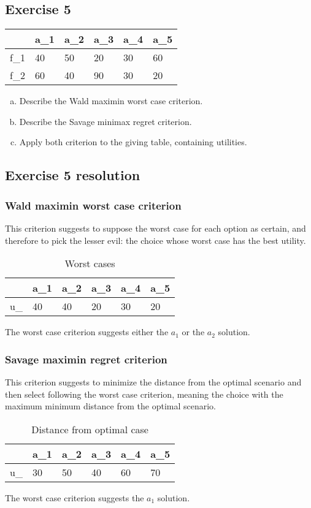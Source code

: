 \documentclass[\main/main.tex]{subfiles}
\begin{document}
\subsection{Exercise 5}

\begin{table}
  \begin{tabular}{L|LLLLL}
        & a_1 & a_2 & a_3 & a_4 & a_5 \\
    \hline
    f_1 & 40  & 50  & 20  & 30  & 60  \\
    f_2 & 60  & 40  & 90  & 30  & 20
  \end{tabular}
\end{table}

\begin{enumerate}[a)]
  \item Describe the Wald maximin worst case criterion.
  \item Describe the Savage minimax regret criterion.
  \item Apply both criterion to the giving table, containing utilities.
\end{enumerate}

\subsection{Exercise 5 resolution}
\subsubsection*{Wald maximin worst case criterion}
This criterion suggests to suppose the worst case for each option as certain, and therefore to pick the lesser evil: the choice whose worst case has the best utility.

\begin{table}
  \begin{tabular}{L|LLLLL}
                    & a_1 & a_2 & a_3 & a_4 & a_5 \\
    \hline
    u_{} & 40  & 40  & 20  & 30  & 20  \\
  \end{tabular}
  \caption{Worst cases}
\end{table}

The worst case criterion suggests either the $a_1$ or the $a_2$ solution.

\subsubsection*{Savage maximin regret criterion}
This criterion suggests to minimize the distance from the optimal scenario and then select following the worst case criterion, meaning the choice with the maximum minimum distance from the optimal scenario.

\begin{table}
  \begin{tabular}{L|LLLLL}
                      & a_1 & a_2 & a_3 & a_4 & a_5 \\
    \hline
    u_{} & 30  & 50  & 40  & 60  & 70  \\
  \end{tabular}
  \caption{Distance from optimal case}
\end{table}

The worst case criterion suggests the $a_1$ solution.
\end{document}
